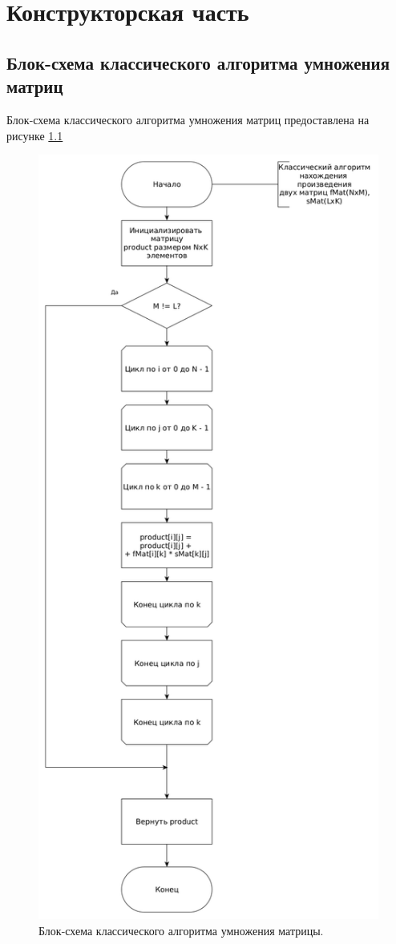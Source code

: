 \documentclass[12pt]{report}
\begin{document}
\newpage

\chapter{Конструкторская часть}
\section{Блок-схема классического алгоритма умножения матриц}
Блок-схема классического алгоритма умножения матриц предоставлена на рисунке \ref{img:classic}
\begin{figure}
\begin{center}
\includegraphics[scale=0.33]{inc/img/classic.png}
\captionsetup{justification=centering}
	\caption{Блок-схема классического алгоритма умножения матрицы.}
	\label{img:classic}	
\end{center}
\end{figure}
\end{document}
